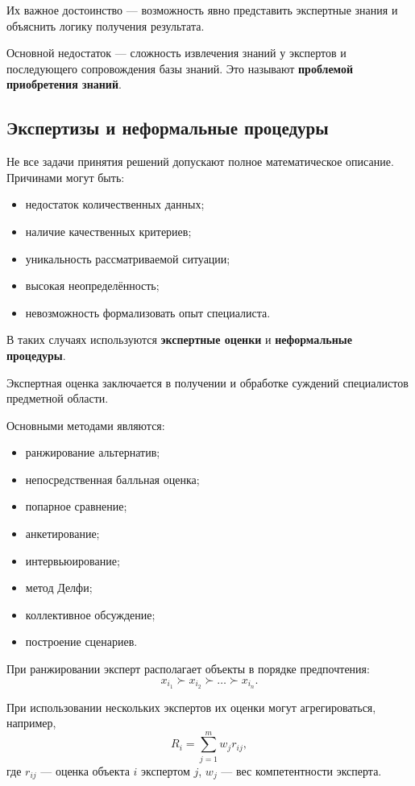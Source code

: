 Их важное достоинство --- возможность явно представить экспертные знания и объяснить логику получения результата.

Основной недостаток --- сложность извлечения знаний у экспертов и последующего сопровождения базы знаний. Это называют \textbf{проблемой приобретения знаний}.

\subsection{Экспертизы и неформальные процедуры}

Не все задачи принятия решений допускают полное математическое описание. Причинами могут быть:
\begin{itemize}
	\item недостаток количественных данных;
	\item наличие качественных критериев;
	\item уникальность рассматриваемой ситуации;
	\item высокая неопределённость;
	\item невозможность формализовать опыт специалиста.
\end{itemize}

В таких случаях используются \textbf{экспертные оценки} и \textbf{неформальные процедуры}.

Экспертная оценка заключается в получении и обработке суждений специалистов предметной области.

Основными методами являются:
\begin{itemize}
	\item ранжирование альтернатив;
	\item непосредственная балльная оценка;
	\item попарное сравнение;
	\item анкетирование;
	\item интервьюирование;
	\item метод Делфи;
	\item коллективное обсуждение;
	\item построение сценариев.
\end{itemize}

При ранжировании эксперт располагает объекты в порядке предпочтения:
\[
x_{i_1}\succ x_{i_2}\succ\ldots\succ x_{i_n}.
\]

При использовании нескольких экспертов их оценки могут агрегироваться, например,
\[
R_i=\sum_{j=1}^{m}w_jr_{ij},
\]
где $r_{ij}$ --- оценка объекта $i$ экспертом $j$, $w_j$ --- вес компетентности эксперта.

